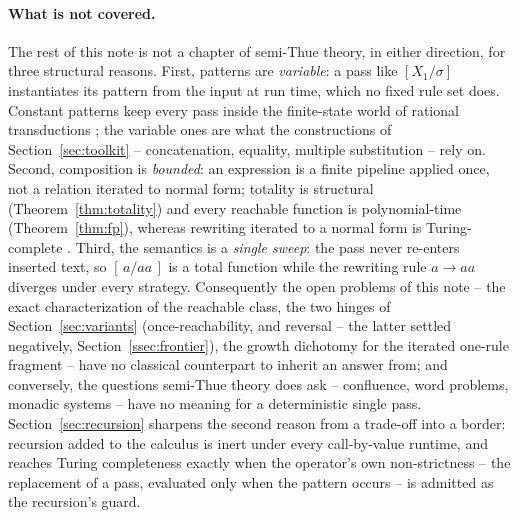 \documentclass[runningheads,envcountsect]{llncs}
\begin{document}
\paragraph{What is not covered.} The rest of this note is not a chapter of semi-Thue theory, in either direction, for three structural reasons. First, patterns are \emph{variable}: a pass like $[X_1/\sigma]$ instantiates its pattern from the input at run time, which no fixed rule set does. Constant patterns keep every pass inside the finite-state world of rational transductions \cite{berstel79,elgot65}; the variable ones are what the constructions of Section~\ref{sec:toolkit} -- concatenation, equality, multiple substitution -- rely on. Second, composition is \emph{bounded}: an expression is a finite pipeline applied once, not a relation iterated to normal form; totality is structural (Theorem~\ref{thm:totality}) and every reachable function is polynomial-time (Theorem~\ref{thm:fp}), whereas rewriting iterated to a normal form is Turing-complete \cite{post47,markov54}. Third, the semantics is a \emph{single sweep}: the pass never re-enters inserted text, so $[\,a/aa\,]$ is a total function while the rewriting rule $a \to aa$ diverges under every strategy. Consequently the open problems of this note -- the exact characterization of the reachable class, the two hinges of Section~\ref{sec:variants} (once-reachability, and reversal -- the latter settled negatively, Section~\ref{ssec:frontier}), the growth dichotomy for the iterated one-rule fragment -- have no classical counterpart to inherit an answer from; and conversely, the questions semi-Thue theory does ask -- confluence, word problems, monadic systems \cite{book93} -- have no meaning for a deterministic single pass. Section~\ref{sec:recursion} sharpens the second reason from a trade-off into a border: recursion added to the calculus is inert under every call-by-value runtime, and reaches Turing completeness exactly when the operator's own non-strictness -- the replacement of a pass, evaluated only when the pattern occurs -- is admitted as the recursion's guard.
\end{document}
